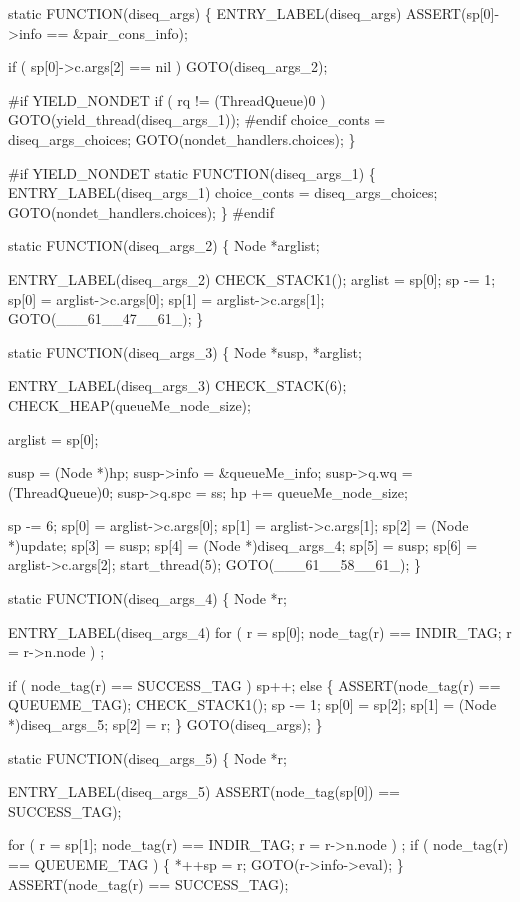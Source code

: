 static
FUNCTION(diseq_args)
\{
 ENTRY_LABEL(diseq_args)
    ASSERT(sp[0]->info == &pair_cons_info);

    if ( sp[0]->c.args[2] == nil )
        GOTO(diseq_args_2);

#if YIELD_NONDET
    if ( rq != (ThreadQueue)0 )
        GOTO(yield_thread(diseq_args_1));
#endif
    choice_conts = diseq_args_choices;
    GOTO(nondet_handlers.choices);
\}

#if YIELD_NONDET
static
FUNCTION(diseq_args_1)
\{
 ENTRY_LABEL(diseq_args_1)
    choice_conts = diseq_args_choices;
    GOTO(nondet_handlers.choices);
\}
#endif

static
FUNCTION(diseq_args_2)
\{
    Node *arglist;

 ENTRY_LABEL(diseq_args_2)
    CHECK_STACK1();
    arglist = sp[0];
    sp     -= 1;
    sp[0]   = arglist->c.args[0];
    sp[1]   = arglist->c.args[1];
    GOTO(___61__47__61_);
\}

static
FUNCTION(diseq_args_3)
\{
    Node *susp, *arglist;

 ENTRY_LABEL(diseq_args_3)
    CHECK_STACK(6);
    CHECK_HEAP(queueMe_node_size);

    arglist = sp[0];

    susp        = (Node *)hp;
    susp->info  = &queueMe_info;
    susp->q.wq  = (ThreadQueue)0;
    susp->q.spc = ss;
    hp         += queueMe_node_size;

    sp   -= 6;
    sp[0] = arglist->c.args[0];
    sp[1] = arglist->c.args[1];
    sp[2] = (Node *)update;
    sp[3] = susp;
    sp[4] = (Node *)diseq_args_4;
    sp[5] = susp;
    sp[6] = arglist->c.args[2];
    start_thread(5);
    GOTO(___61__58__61_);
\}

static
FUNCTION(diseq_args_4)
\{
    Node *r;

 ENTRY_LABEL(diseq_args_4)
    for ( r = sp[0]; node_tag(r) == INDIR_TAG; r = r->n.node )
        ;

    if ( node_tag(r) == SUCCESS_TAG )
        sp++;
    else
    \{
        ASSERT(node_tag(r) == QUEUEME_TAG);
        CHECK_STACK1();
        sp   -= 1;
        sp[0] = sp[2];
        sp[1] = (Node *)diseq_args_5;
        sp[2] = r;
    \}
    GOTO(diseq_args);
\}

static
FUNCTION(diseq_args_5)
\{
    Node *r;

 ENTRY_LABEL(diseq_args_5)
    ASSERT(node_tag(sp[0]) == SUCCESS_TAG);

    for ( r = sp[1]; node_tag(r) == INDIR_TAG; r = r->n.node )
        ;
    if ( node_tag(r) == QUEUEME_TAG )
    \{
        *++sp = r;
        GOTO(r->info->eval);
    \}
    ASSERT(node_tag(r) == SUCCESS_TAG);

